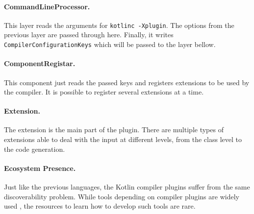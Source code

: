 \paragraph{CommandLineProcessor.}
This layer reads the arguments for \texttt{kotlinc -Xplugin}.
The options from the previous layer are passed through here.
Finally, it writes \texttt{CompilerConfigurationKeys} which will be passed to the layer bellow.

\paragraph{ComponentRegistar.}
This component just reads the passed keys and registers extensions to be used by the compiler.
It is possible to register several extensions at a time.

\paragraph{Extension.}
The extension is the main part of the plugin.
There are multiple types of extensions able to deal with the input at different levels,
from the class level to the code generation.

\paragraph{Ecosystem Presence.}
Just like the previous languages, the Kotlin compiler plugins suffer from the same discoverability problem.
While tools depending on compiler plugins are widely used ,
the resources to learn how to develop such tools are rare.

